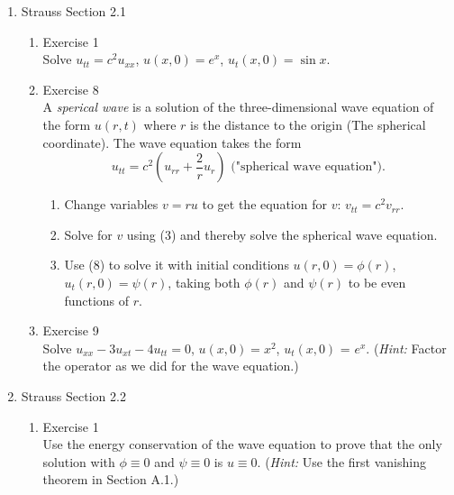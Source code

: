 \documentclass[12pt]{article}%
\begin{document}
\begin{enumerate}
    \pagebreak
    
    \item Strauss Section 2.1 \smallskip
    \begin{enumerate}
        \item Exercise 1 \smallskip \\
        Solve $u_{tt} = c^2u_{xx}$, $u\left(x,0\right) = e^x$, $u_t\left(x,0\right) = \sin{x}$. \smallskip \\
        
        \item Exercise 8 \smallskip \\
        A \emph{sperical wave} is a solution of the three-dimensional wave equation of the form $u\left(r,t\right)$ where $r$ is the distance to the origin (The spherical coordinate). The wave equation takes the form
        $$u_{tt} = c^2\left(u_{rr} + \frac{2}{r}u_r\right) \text{    ("spherical wave equation").}$$
        \begin{enumerate}
            \item Change variables $v= ru$ to get the equation for $v$:  $v_{tt} = c^2v_{rr}$. \smallskip \\

            \item Solve for $v$ using (3) and thereby solve the spherical wave equation. \smallskip \\

            \item Use (8) to solve it with initial conditions $u\left(r,0\right) = \phi\left(r\right)$, $u_t\left(r,0\right) = \psi\left(r\right)$, taking both $\phi\left(r\right)$ and $\psi\left(r\right)$ to be even functions of $r$. \smallskip \\

            
        \end{enumerate}
        
        \item Exercise 9 \smallskip \\
        Solve $u_{xx} - 3 u_{xt} - 4u_{tt} = 0$, $u\left(x,0\right) = x^2$, $u_t\left(x,0\right)$ = $e^x$. (\emph{Hint:} Factor the operator as we did for the wave equation.) \smallskip \\

        
    \end{enumerate}

    \pagebreak
    
    \item Strauss Section 2.2 \smallskip
    \begin{enumerate}
        \item Exercise 1 \smallskip \\
        Use the energy conservation of the wave equation to prove that the only solution with $\phi \equiv 0$ and $\psi \equiv 0$ is $u \equiv 0$. (\emph{Hint:} Use the first vanishing theorem in Section A.1.) \smallskip \\


\end{enumerate}
\end{enumerate}
\end{document}
